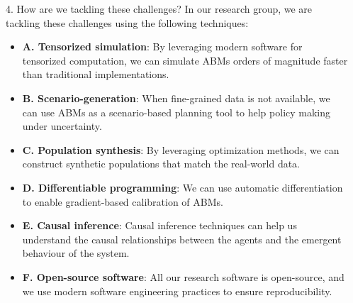 \documentclass[final,hyperref={pdfpagelabels=false}]{beamer}
\begin{document}
\begin{frame}[t]
\begin{columns}[t]
\begin{column}{.48\textwidth}
    \begin{block}{4. How are we tackling these challenges?}
      In our research group, we are tackling these challenges using the following techniques:
      \begin{itemize}
        \item \justifying \textbf{A. Tensorized simulation}: By leveraging modern software for tensorized computation, we can simulate ABMs orders of magnitude faster than traditional implementations.
        \item \justifying \textbf{B. Scenario-generation}: When fine-grained data is not available, we can use ABMs as a scenario-based planning tool to help policy making under uncertainty.
        \item \justifying \textbf{C. Population synthesis}: By leveraging optimization methods, we can construct synthetic populations that match the real-world data. 
        \item \justifying \textbf{D. Differentiable programming}: We can use automatic differentiation to enable gradient-based calibration of ABMs.
        \item \justifying \textbf{E. Causal inference}: Causal inference techniques can help us understand the causal relationships between the agents and the emergent behaviour of the system.
        \item \justifying \textbf{F. Open-source software}: All our research software is open-source, and we use modern software engineering practices to ensure reproducibility.

      \end{itemize}
    \end{block}

  \end{column} %



  \begin{column}{.01\textwidth}\end{column} %

\end{columns} %


\end{frame}
\end{document}
